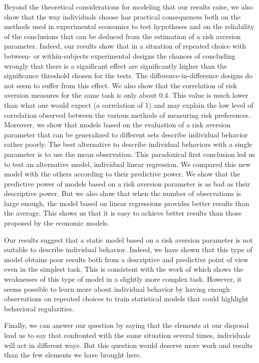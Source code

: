 \documentclass[
]{book}
\begin{document}
Beyond the theoretical considerations for modeling that our results
raise, we also show that the way individuals choose has practical
consequences both on the methods used in experimental economics to test
hypotheses and on the reliability of the conclusions that can be deduced
from the estimation of a risk aversion parameter. Indeed, our results
show that in a situation of repeated choice with between- or within-subjects
experimental designs the chances of concluding wrongly that there is a
significant effect are significantly higher than the significance threshold chosen for the tests.
The difference-in-difference designs do not seem to suffer from this
effect. We also show that the correlation of risk aversion measures for
the same task is only about
0.4.
This value is much lower than what one would expect (a correlation of 1)
and may explain the low level of correlation observed between the
various methods of measuring risk preferences. Moreover, we show that
models based on the evaluation of a risk aversion parameter that can be
generalized to different sets describe
individual behavior rather poorly. The best alternative to describe individual
behaviors with a single parameter is to use the mean observation. This
paradoxical first conclusion led us to test an
alternative model, individual linear regression. We compared this new
model with the others according to their predictive power. We show that
the predictive power of models based on a risk aversion parameter is as
bad as their descriptive power. But we also show that when the number of
observations is large enough, the model based on linear regressions
provides better results than the average. This shows us that it is easy to
achieve better results than those proposed by the economic models.

Our results suggest that a static model based on a risk aversion
parameter is not suitable to describe individual behavior. Indeed, we
have shown that this type of model obtains poor results both from a
descriptive and predictive point of view even in the simplest task. This
is consistent with the work of \citet{wilcox2007predicting} which shows the
weaknesses of this type of model in a slightly more complex task.
However, it seems possible to learn more about individual behavior by
having enough observations on repeated choices to train statistical
models that could highlight behavioral regularities.

Finally, we can answer our question by saying that the elements at our
disposal lead us to say that confronted with the same situation several
times, individuals will act in different ways. But this question would
deserve more work and results than the few elements we have brought
here.
\end{document}
